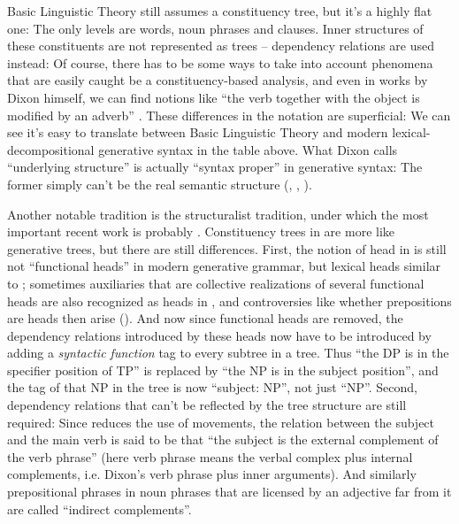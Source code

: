 \documentclass[UTF8, a4paper, oneside, scheme=plain]{ctexrep}
\newcommand*{\citepage}[1]{pp.~{#1}}
\begin{document}
Basic Linguistic Theory still assumes a constituency tree,
but it's a highly flat one:
The only levels are words, noun phrases and clauses.
Inner structures of these constituents are not represented as trees -- 
dependency relations are used instead:
Of course, there has to be some ways 
to take into account phenomena that are easily caught be a constituency-based analysis,
and even in works by Dixon himself,
we can find notions like ``the verb together with the object is modified by an adverb''
\citep[\citepage{376}]{dixon2005semantic}.
These differences in the notation are superficial:
We can see it's easy to translate between Basic Linguistic Theory 
and modern lexical-decompositional generative syntax
in the table above.
What Dixon calls ``underlying structure'' is actually ``syntax proper'' in generative syntax:
The former simply can't be the real semantic structure 
(, ,
).

Another notable tradition is the structuralist tradition,
under which the most important recent work is probably \citet{cgel}.
Constituency trees in \citet{cgel} are more like generative trees,
but there are still differences.
First, the notion of head in \citet{cgel} is still not ``functional heads'' 
in modern generative grammar, but lexical heads similar to \citet{dixon2009basic1};
sometimes auxiliaries that are collective realizations of several functional heads 
are also recognized as heads in \citet{cgel}, 
and controversies like whether prepositions are heads then arise
().
And now since functional heads are removed,
the dependency relations introduced by these heads
now have to be introduced by adding a \emph{syntactic function} tag 
to every subtree in a tree.
Thus ``the DP is in the specifier position of TP''
is replaced by ``the NP is in the subject position'',
and the tag of that NP in the tree is now ``subject: NP'',
not just ``NP''.
Second, dependency relations that can't be reflected by the tree structure are still required:
Since \citet{cgel} reduces the use of movements,
the relation between the subject and the main verb 
is said to be that ``the subject is the external complement of the verb phrase''
(here verb phrase means the verbal complex plus internal complements,
i.e. Dixon's verb phrase plus inner arguments).
And similarly prepositional phrases in noun phrases that are licensed by an adjective far from it 
are called ``indirect complements''.
\end{document}
